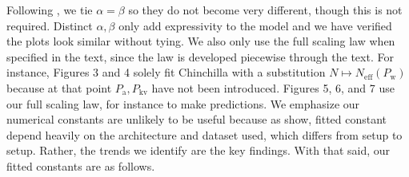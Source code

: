 \documentclass[11pt]{article}
\begin{document}
Following \citep{muennighoff2024scaling}, we tie $\alpha = \beta$ so they do not become very different, though this is not required. Distinct $\alpha, \beta$ only add expressivity to the model and we have verified the plots look similar without tying. We also only use the full scaling law when specified in the text, since the law is developed piecewise through the text. For instance, Figures 3 and 4 solely fit Chinchilla with a substitution $N \mapsto N_\text{eff}(P_\text{w})$ because at that point $P_\text{a}, P_\text{kv}$ have not been introduced. Figures 5, 6, and 7 use our full scaling law, for instance to make predictions. We emphasize our numerical constants are unlikely to be useful because as \citep{hoffmann2022training, sardana2023beyond} show, fitted constant depend heavily on the architecture and dataset used, which differs from setup to setup. Rather, the trends we identify are the key findings. With that said, our fitted constants are as follows. 


\end{document}
